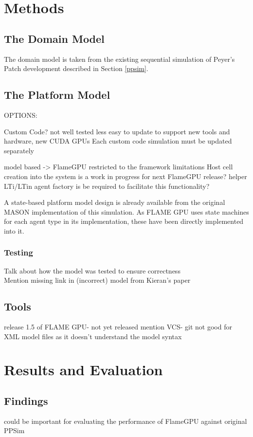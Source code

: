 \documentclass{UoYCSproject}
\begin{document}
\chapter{Methods}
\label{methods}
\section{The Domain Model}
The domain model is taken from the existing sequential simulation of Peyer's Patch development described in Section \ref{ppsim}.

\section{The Platform Model}
OPTIONS:

Custom Code?\cite{phil_diss}
	not well tested
	less easy to update to support new tools and hardware, new CUDA GPUs
		Each custom code simulation must be updated separately


model based -> FlameGPU\cite{flame_keratinocyte}
	restricted to the framework limitations
		Host cell creation into the system is a work in progress for next FlameGPU release?
			helper LTi/LTin agent factory is be required to facilitate this functionality?


	A state-based platform model design is already available from the original MASON implementation of this simulation.
	As FLAME GPU uses state machines for each agent type in its implementation, these have been directly implemented into it.

\subsection{Testing}
Talk about how the model was tested to ensure correctness\\
Mention missing link in (incorrect) model from Kieran's paper 

\section{Tools}
release 1.5 of FLAME GPU- not yet released
mention VCS- git not good for XML model files as it doesn't understand the model syntax

\chapter{Results and Evaluation}
\section{Findings}
\cite{statistical_tests} could be important for evaluating the performance of FlameGPU against original PPSim
\end{document}
